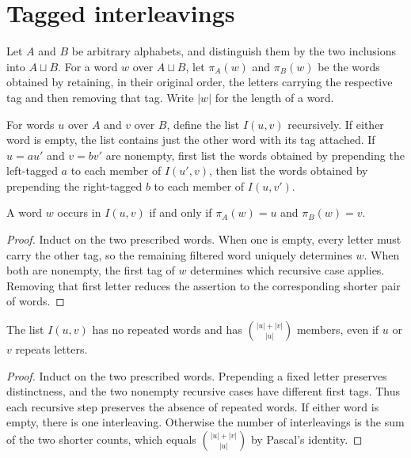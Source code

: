 \section{Tagged interleavings}
\label{sec:tagged_interleavings}

Let $A$ and $B$ be arbitrary alphabets, and distinguish them by the two
inclusions into $A\sqcup B$.  For a word $w$ over $A\sqcup B$, let
$\pi_A(w)$ and $\pi_B(w)$ be the words obtained by retaining, in their
original order, the letters carrying the respective tag and then removing
that tag.  Write $|w|$ for the length of a word.

\begin{definition}
\label{def:tagged_interleavings}
\leanok
For words $u$ over $A$ and $v$ over $B$, define the list $I(u,v)$ recursively.
If either word is empty, the list contains just the other word with its tag
attached.  If $u=au'$ and $v=bv'$ are nonempty, first list the words obtained
by prepending the left-tagged $a$ to each member of $I(u',v)$, then list the
words obtained by prepending the right-tagged $b$ to each member of $I(u,v')$.
\end{definition}

\begin{lemma}
\label{lem:tagged_interleavings_filter}
\leanok
{}
A word $w$ occurs in $I(u,v)$ if and only if
$\pi_A(w)=u$ and $\pi_B(w)=v$.
\end{lemma}
\begin{proof}
\leanok
Induct on the two prescribed words.  When one is empty, every letter must
carry the other tag, so the remaining filtered word uniquely determines
$w$.  When both are nonempty, the first tag of $w$ determines which recursive
case applies.  Removing that first letter reduces the assertion to the
corresponding shorter pair of words.
\end{proof}

\begin{lemma}
\label{lem:tagged_interleavings_count}
\leanok
{}
The list $I(u,v)$ has no repeated words and has
$\binom{|u|+|v|}{|u|}$ members, even if $u$ or $v$ repeats letters.
\end{lemma}
\begin{proof}
\leanok
Induct on the two prescribed words.  Prepending a fixed letter preserves
distinctness, and the two nonempty recursive cases have different first
tags.  Thus each recursive step preserves the absence of repeated words.
If either word is empty, there is one interleaving.  Otherwise the number
of interleavings is the sum of the two shorter counts, which equals
$\binom{|u|+|v|}{|u|}$ by Pascal's identity.
\end{proof}


